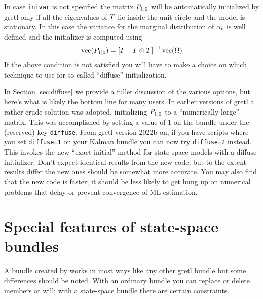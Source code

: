 In case \texttt{inivar} is not specified the matrix
$P_{1|0}$ will be automatically initialized by gretl only if
all the eigenvalues of $T$ lie inside the unit circle and the
model is stationary. In this case the variance for the marginal
distribution of $\alpha_t$ is well defined and the initializer is
computed using
\[
\mbox{vec}(P_{1|0}) = \left[ I - T \otimes T
\right]^{-1} \mbox{vec}(\Omega)
\]
If the above condition is not satisfied you will have to make a choice
on which technique to use for so-called ``diffuse'' initialization.

In Section \ref{sec:diffuse} we provide a fuller discussion of the
various options, but here's what is likely the bottom line for many
users. In earlier versions of gretl a rather crude solution was
adopted, initializing $P_{1|0}$ to a ``numerically large''
matrix. This was accomplished by setting a value of 1 on the bundle
under the (reserved) key \texttt{diffuse}.  From gretl version 2022b
on, if you have scripts where you set \texttt{diffuse=1} on your
Kalman bundle you can now try \texttt{diffuse=2} instead. This invokes
the new ``exact initial'' method for state space models with a diffuse
initializer. Don't expect identical results from the new code, but to
the extent results differ the new ones should be somewhat more
accurate. You may also find that the new code is faster; it should be
less likely to get hung up on numerical problems that delay or prevent
convergence of ML estimation.

\section{Special features of state-space bundles}
\label{sec:ss-special}

A bundle created by  works in most ways like any other
gretl bundle but some differences should be noted.  With an ordinary
bundle you can replace or delete members at will; with a state-space
bundle there are certain constraints.

